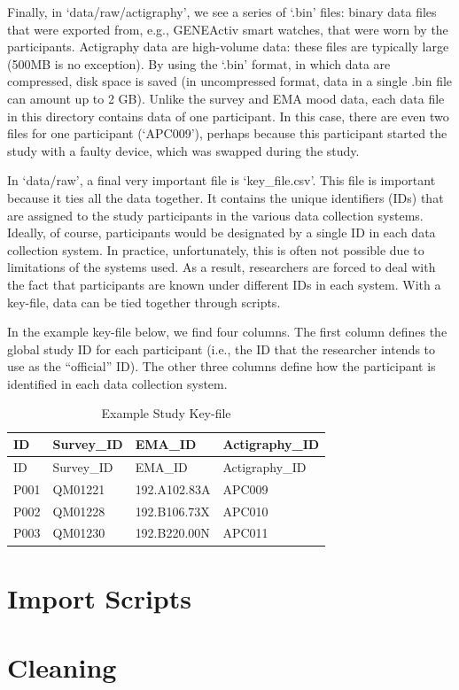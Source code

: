 \documentclass[]{book}
\begin{document}
Finally, in `data/raw/actigraphy', we see a series of `.bin' files:
binary data files that were exported from, e.g., GENEActiv smart
watches, that were worn by the participants. Actigraphy data are
high-volume data: these files are typically large (500MB is no
exception). By using the `.bin' format, in which data are compressed,
disk space is saved (in uncompressed format, data in a single .bin file
can amount up to 2 GB). Unlike the survey and EMA mood data, each data
file in this directory contains data of one participant. In this case,
there are even two files for one participant (`APC009'), perhaps because
this participant started the study with a faulty device, which was
swapped during the study.

In `data/raw', a final very important file is `key\_file.csv'. This file
is important because it ties all the data together. It contains the
unique identifiers (IDs) that are assigned to the study participants in
the various data collection systems. Ideally, of course, participants
would be designated by a single ID in each data collection system. In
practice, unfortunately, this is often not possible due to limitations
of the systems used. As a result, researchers are forced to deal with
the fact that participants are known under different IDs in each system.
With a key-file, data can be tied together through scripts.

In the example key-file below, we find four columns. The first column
defines the global study ID for each participant (i.e., the ID that the
researcher intends to use as the ``official'' ID). The other three
columns define how the participant is identified in each data collection
system.

\begin{longtable}[]{@{}llll@{}}
\caption{\label{tab:tab5a} Example Study Key-file}\tabularnewline
\toprule
ID & Survey\_ID & EMA\_ID & Actigraphy\_ID\tabularnewline
\midrule
\endfirsthead
\toprule
ID & Survey\_ID & EMA\_ID & Actigraphy\_ID\tabularnewline
\midrule
\endhead
P001 & QM01221 & 192.A102.83A & APC009\tabularnewline
P002 & QM01228 & 192.B106.73X & APC010\tabularnewline
P003 & QM01230 & 192.B220.00N & APC011\tabularnewline
\bottomrule
\end{longtable}

\section{Import Scripts}\label{import-scripts}

\section{Cleaning}\label{cleaning}
\end{document}
